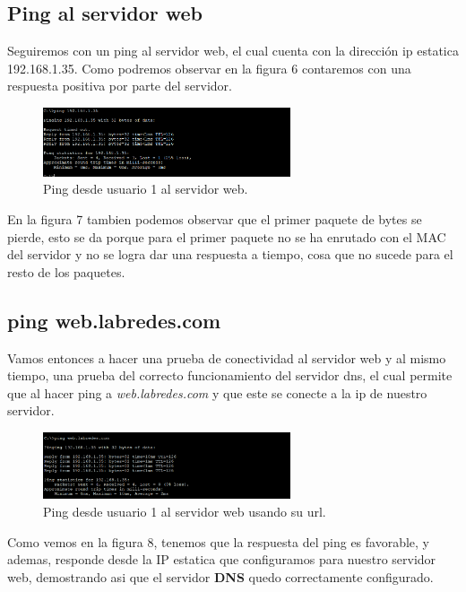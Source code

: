\documentclass[10pt]{article}
\begin{document}
\subsection{Ping al servidor web}
Seguiremos con un ping al servidor web, el cual cuenta con la dirección ip estatica 192.168.1.35. Como podremos observar en la figura 6 contaremos con una respuesta positiva por parte del servidor.
\begin{figure}[H]
    \centering
    \includegraphics[width=0.65\textwidth]{lab-01-screenshots/43-2-ping-web.png}
    \caption{Ping desde usuario 1 al servidor web.}
\end{figure}
En la figura 7 tambien podemos observar que el primer paquete de bytes se pierde, esto se da porque para el primer paquete no se ha enrutado con el MAC del servidor y no se logra dar una respuesta a tiempo, cosa que no sucede para el resto de los paquetes.
\subsection{ping web.labredes.com}
Vamos entonces a hacer una prueba de conectividad al servidor web y al mismo tiempo, una prueba del correcto funcionamiento del servidor dns, el cual permite que al hacer ping a \textit {web.labredes.com} y que este se conecte a la ip de nuestro servidor. 
\begin{figure}[H]
    \centering
    \includegraphics[width=0.65\textwidth]{lab-01-screenshots/43-3-ping-web.png}
    \caption{Ping desde usuario 1 al servidor web usando su url.}
\end{figure}
Como vemos en la figura 8, tenemos que la respuesta del ping es favorable, y ademas, responde desde la IP estatica que configuramos para nuestro servidor web, demostrando asi que el servidor \textbf {DNS} quedo correctamente configurado.
\end{document}
